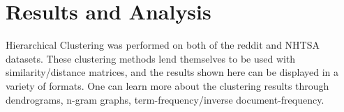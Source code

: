 \chapter{Results and Analysis}


Hierarchical Clustering was performed on both of the reddit and NHTSA datasets. These clustering methods lend themselves to be used with similarity/distance matrices, and the results shown here can be displayed in a variety of formats. One can learn more about the clustering results through dendrograms, n-gram graphs, term-frequency/inverse document-frequency.

